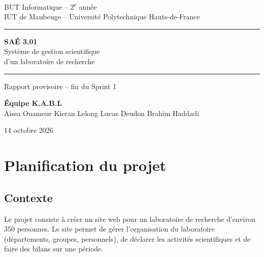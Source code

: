 \documentclass[11pt,a4paper]{article}
\begin{document}
\begin{titlepage}
\centering

{\large BUT Informatique -- 2\textsuperscript{e} année}\\[0.2cm]
IUT de Maubeuge -- Université Polytechnique Hauts-de-France

\vspace{3.5cm}

{\color{bleu}\rule{\textwidth}{1.5pt}}          %
\vspace{0.6cm}

{\Huge\bfseries\color{bleu} SAÉ 3.01}\\[0.5cm]
{\LARGE Système de gestion scientifique\\[0.2cm] d'un laboratoire de recherche}

\vspace{0.6cm}
{\color{bleu}\rule{\textwidth}{1.5pt}}          %

\vspace{1cm}
{\Large Rapport provisoire -- fin du Sprint 1}

\vfill                                           %

{\large\bfseries Équipe K.A.B.L}\\[0.3cm]
Aïssa Ouameur \quad Kieran Lelong \quad Lucas Deudon \quad Brahim Haddadi

\vspace{1cm}
14 octobre 2026
\end{titlepage}

\tableofcontents
\newpage

\section{Planification du projet}

\subsection{Contexte}

Le projet consiste à créer un site web pour un laboratoire de recherche d'environ 350 personnes. Le site permet de gérer l'organisation du laboratoire (départements, groupes, personnels), de déclarer les activités scientifiques et de faire des bilans sur une période.
\end{document}
